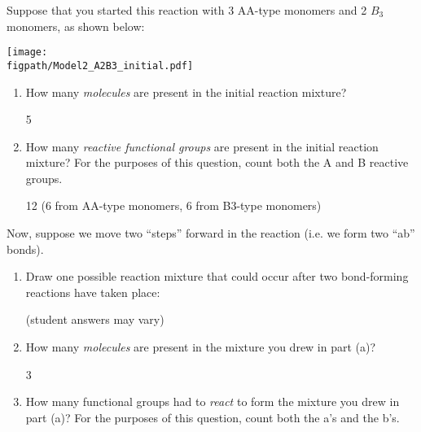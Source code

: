 \begin{activity}
\begin{ctqs}

	\question Suppose that you started this reaction with 3 AA-type monomers and 2 $B_3$ monomers, as shown below:
	
	\vspace{9pt}
		\centerline{\texttt{[image: \\figpath/Model2\_A2B3\_initial.pdf]}}
	
		\begin{enumerate}
			\item How many \emph{molecules} are present in the initial reaction mixture?
			
				\begin{solution}[0.5in]
					5
				\end{solution}
			
			\item How many \emph{reactive functional groups} are present in the initial reaction mixture?  For the purposes of this question, count both the A and B reactive groups.
			
				\begin{solution}[0.5in]
					12 (6 from AA-type monomers, 6 from B3-type monomers)
				\end{solution}
			
		\end{enumerate}
		
	\question Now, suppose we move two ``steps'' forward in the reaction (i.e. we form two ``ab'' bonds).
	
		\begin{enumerate}
		
			\item Draw one possible reaction mixture that could occur after two bond-forming reactions have taken place:
			
				\begin{solution}[1.25in]
				
					(student answers may vary)
					
				\end{solution}
			\item How many \emph{molecules} are present in the mixture you drew in part (a)?
			
				\begin{solution}[0.5in]
					3
				\end{solution}
			
			\item How many functional groups had to \emph{react} to form the mixture you drew in part (a)?  For the purposes of this question, count both the a's and the b's.
			

\end{enumerate}
\end{ctqs}
\end{activity}
